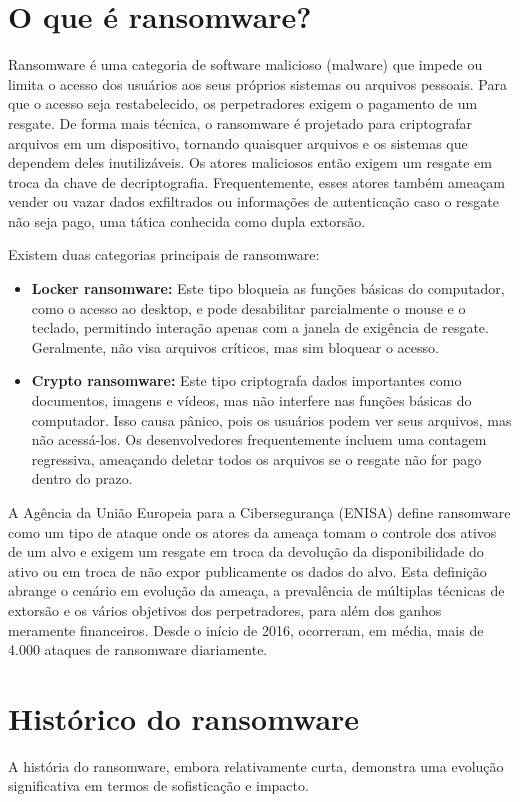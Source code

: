 \section{O que é ransomware?}
Ransomware é uma categoria de software malicioso (malware) que impede ou limita o acesso dos usuários aos seus próprios 
sistemas ou arquivos pessoais. Para que o acesso seja restabelecido, os perpetradores exigem o pagamento de um resgate. 
De forma mais técnica, o ransomware é projetado para criptografar arquivos em um dispositivo, tornando quaisquer arquivos e os 
sistemas que dependem deles inutilizáveis. Os atores maliciosos então exigem um resgate em troca da chave de decriptografia. 
Frequentemente, esses atores também ameaçam vender ou vazar dados exfiltrados ou informações de autenticação caso o resgate não seja 
pago, uma tática conhecida como dupla extorsão.

Existem duas categorias principais de ransomware:
\begin{itemize}
    \item \textbf{Locker ransomware:} Este tipo bloqueia as funções básicas do computador, como o acesso ao desktop, e pode 
    desabilitar parcialmente o mouse e o teclado, permitindo interação apenas com a janela de exigência de resgate. 
    Geralmente, não visa arquivos críticos, mas sim bloquear o acesso.

    \item \textbf{Crypto ransomware:} Este tipo criptografa dados importantes como documentos, 
    imagens e vídeos, mas não interfere nas funções básicas do computador. Isso causa pânico, pois os usuários 
    podem ver seus arquivos, mas não acessá-los. Os desenvolvedores frequentemente incluem uma contagem regressiva, 
    ameaçando deletar todos os arquivos se o resgate não for pago dentro do prazo.
\end{itemize}

A Agência da União Europeia para a Cibersegurança (ENISA) define ransomware como um tipo 
de ataque onde os atores da ameaça tomam o controle dos ativos de um alvo e exigem um resgate em troca 
da devolução da disponibilidade do ativo ou em troca de não expor publicamente os dados do alvo. Esta definição 
abrange o cenário em evolução da ameaça, a prevalência de múltiplas técnicas de extorsão e os vários objetivos dos 
perpetradores, para além dos ganhos meramente financeiros. Desde o início de 2016, ocorreram, em média, mais de 4.000 
ataques de ransomware diariamente.

\section{Histórico do ransomware}
A história do ransomware, embora relativamente curta, demonstra uma evolução significativa em termos de sofisticação e impacto.   


